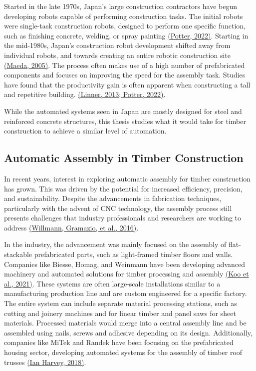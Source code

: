 \documentclass[11pt]{book}
\begin{document}
Started in the late 1970s, Japan’s large construction contractors have begun developing robots capable of performing construction tasks. The initial robots were single-task construction robots, designed to perform one specific function, such as finishing concrete, welding, or spray painting \href{https://www.zotero.org/google-docs/?vwNv2H}{(Potter, 2022)}. Starting in the mid-1980s, Japan’s construction robot development shifted away from individual robots, and towards creating an entire robotic construction site \href{https://www.zotero.org/google-docs/?f7fifK}{(Maeda, 2005)}. The process often makes use of a high number of prefabricated components and focuses on improving the speed for the assembly task. Studies have found that the productivity gain is often apparent when constructing a tall and repetitive building. \href{https://www.zotero.org/google-docs/?NRpif9}{(Linner, 2013; Potter, 2022)}. 

While the automated systems seen in Japan are mostly designed for steel and reinforced concrete structures, this thesis studies what it would take for timber construction to achieve a similar level of automation. 

\subsection{Automatic Assembly in Timber Construction}

In recent years, interest in exploring automatic assembly for timber construction has grown. This was driven by the potential for increased efficiency, precision, and sustainability. Despite the advancements in fabrication techniques, particularly with the advent of CNC technology, the assembly process still presents challenges that industry professionals and researchers are working to address \href{https://www.zotero.org/google-docs/?VCZ0h4}{(Willmann, Gramazio, et al., 2016)}.

In the industry, the advancement was mainly focused on the assembly of flat-stackable prefabricated parts, such as light-framed timber floors and walls. Companies like Biesse, Homag, and Weinmann have been developing advanced machinery and automated solutions for timber processing and assembly \href{https://www.zotero.org/google-docs/?Ii4M5y}{(Koo et al., 2021)}. These systems are often large-scale installations similar to a manufacturing production line and are custom engineered for a specific factory. The entire system can include separate material processing stations, such as cutting and joinery machines and for linear timber and panel saws for sheet materials. Processed materials would merge into a central assembly line and be assembled using nails, screws and adhesive depending on its design. Additionally, companies like MiTek and Randek have been focusing on the prefabricated housing sector, developing automated systems for the assembly of timber roof trusses \href{https://www.zotero.org/google-docs/?N2kZjO}{(Ian Harvey, 2018)}. 
\end{document}
